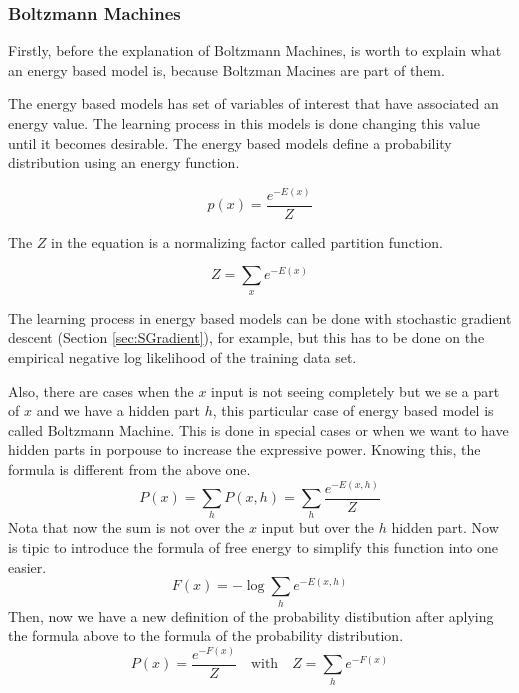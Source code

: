 \documentclass[12pt]{article}
\begin{document}
\subsubsection{Boltzmann Machines}

Firstly, before the explanation of Boltzmann Machines, is worth to explain what an energy based model is, because Boltzman Macines are part of them.

The energy based models has set of variables of interest that have associated an energy value. The learning process in this models is done changing this value until it becomes desirable. The energy based models define a probability distribution using an energy function.

\begin{equation}
  p(x)=\frac{e^{-E(x)}}{Z}
\end{equation}

The $Z$ in the equation is a normalizing factor called partition function.

\begin{equation}
  Z=\displaystyle\sum_{x} e^{-E(x)}
\end{equation}

The learning process in energy based models can be done with stochastic gradient descent (Section \ref{sec:SGradient}), for example, but this has to be done on the empirical negative log likelihood of the training data set. 

Also, there are cases when the $x$ input is not seeing completely but we se a part of $x$ and we have a hidden part $h$, this particular case of energy based model is called Boltzmann Machine. This is done in special cases or when we want to have hidden parts in porpouse to increase the expressive power. Knowing this, the formula is different from the above one.
\begin{equation}
  P(x)=\displaystyle\sum_{h} P(x,h)=\displaystyle\sum_{h} \frac{e^{-E(x,h)}}{Z}
\end{equation}
Nota that now the sum is not over the $x$ input but over the $h$ hidden part. Now is tipic to introduce the formula of free energy to simplify this function into one easier.
\begin{equation}
  F(x)=- \log\displaystyle\sum_{h}{e^{-E(x,h)}}
\end{equation}
Then, now we have a new definition of the probability distibution after aplying the formula above to the formula of the probability distribution.
\begin{equation}
  P(x)=\frac{e^{-F(x)}}{Z}\quad \textrm{with}\quad Z= \displaystyle\sum_{h}{e^{-F(x)}}
\end{equation}
\end{document}
